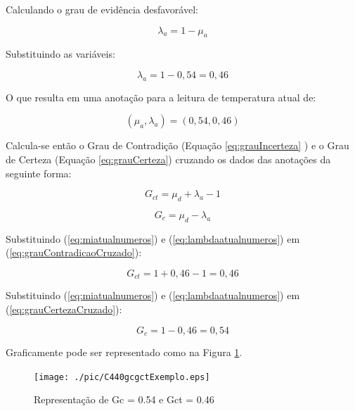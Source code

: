 Calculando o grau de evidência desfavorável:

\begin{equation}
\lambda _{a}= 1 - \mu _{a}
\label{eq:lambdaatual}
\end{equation}

Substituindo as variáveis:

\begin{equation}
\lambda _{a}= 1 - 0,54 = 0,46
\label{eq:lambdaatualnumeros}
\end{equation}

O que resulta em uma anotação para a leitura de temperatura atual de: 

\begin{equation}
( \mu _{a}, \lambda _{a} ) = (0,54 , 0,46)
\label{eq:valoratual}
\end{equation}

Calcula-se então o Grau de Contradição (Equação \ref{eq:grauIncerteza} ) e o Grau de Certeza (Equação \ref{eq:grauCerteza}) cruzando os dados das anotações da seguinte forma:

\begin{equation}
G _{ct} = \mu _{d} + \lambda _{a} - 1
\label{eq:grauContradicaoCruzado}
\end{equation}

\begin{equation}
G _{c} = \mu _{d} - \lambda _{a}
\label{eq:grauCertezaCruzado}
\end{equation}


Substituindo (\ref{eq:miatualnumeros}) e (\ref{eq:lambdaatualnumeros}) em (\ref{eq:grauContradicaoCruzado}):

\begin{equation}
G _{ct} = 1 + 0,46 - 1 = 0,46
\label{eq:grauContradicaoResulta}
\end{equation}

Substituindo (\ref{eq:miatualnumeros}) e (\ref{eq:lambdaatualnumeros}) em (\ref{eq:grauCertezaCruzado}):

\begin{equation}
G _{c} = 1 - 0,46 = 0,54
\label{eq:grauCertezaResulta}
\end{equation}

Graficamente pode ser representado como na Figura \ref{fig:gcgctExemplo}.

\begin{figure}[!htb]
\center\texttt{[image: ./pic/C440gcgctExemplo.eps]}
\caption{Representação de Gc = 0.54 e Gct = 0.46}
\label{fig:gcgctExemplo}
\end{figure}





